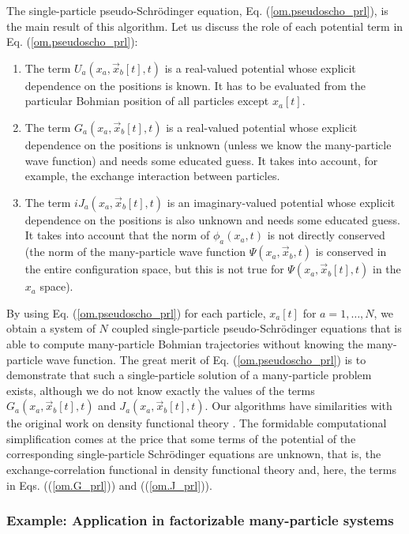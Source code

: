 \documentclass[onecolumn,nofootinbib, secnumarabic, amsmath, nobibnotes,11pt,aps,pra]{revtex4-1}
\newcommand{\pref}[1]{(\ref{#1})}
\newcommand{\eref}[1]{Eq. (\ref{#1})}
\begin{document}
The single-particle pseudo-Schr\"odinger equation,
\eref{om.pseudoscho_prl}, is the main result of this algorithm. Let
us discuss the role of each potential term in
\eref{om.pseudoscho_prl}:
\begin{enumerate}
\item The term \textit{$U_{a}(x_{a},\vec x_{b}[t],t)$} is a real-valued potential whose explicit dependence on the positions is known. It has to be evaluated from the particular Bohmian position of all particles except $x_a[t]$.

\item The term \textit{$G_{a}(x_{a},\vec x_{b}[t],t)$} is a real-valued potential whose explicit dependence on the positions is unknown (unless we know the many-particle wave function) and needs some educated guess. It takes into account, for example, the exchange interaction between particles.

\item The term \textit{$i J_{a}(x_{a},\vec x_{b}[t],t)$} is an imaginary-valued potential whose explicit dependence on the positions is also unknown and needs some educated guess. It takes into account that the norm of $\phi_{a}(x_{a},t)$ is not directly conserved (the norm of the many-particle wave function $\Psi(x_a,\vec x_b,t)$ is conserved in the entire configuration space, but this is not true for $\Psi(x_a,\vec x_b[t],t)$ in the $x_a$ space).
\end{enumerate}

By using \eref{om.pseudoscho_prl} for each particle, $x_a[t]$ for $a = 1,\ldots,N$, we obtain a  system of $N$ coupled single-particle pseudo-Schr\"odinger equations that is able to compute many-particle Bohmian trajectories without knowing the many-particle wave function. The great merit of \eref{om.pseudoscho_prl} is to demonstrate that such a single-particle solution of a many-particle problem exists, although we do not know exactly the values of the terms $G_{a}(x_{a}, \vec x_{b}[t],t)$ and $J_{a}(x_{a},\vec x_{b}[t],t)$. Our algorithms have similarities with the original work on density functional theory \cite{om.kohn1964,om.kohn1965}. The formidable computational simplification comes at the price that some terms of the potential of the corresponding single-particle Schr\"odinger equations are unknown, that is, the exchange-correlation functional in density functional theory \cite{om.kohn1964,om.kohn1965} and, here, the terms in Eqs. (\pref{om.G_prl}) and (\pref{om.J_prl}).

\subsubsection{Example: Application in factorizable many-particle systems}
\end{document}
